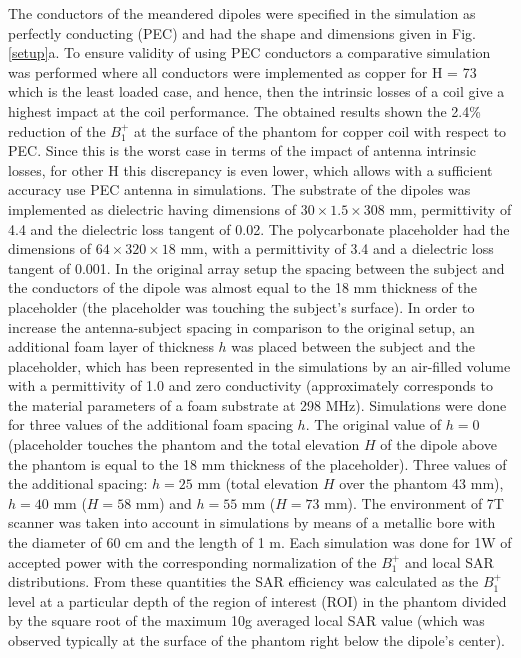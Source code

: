 \documentclass[fleqn,10pt]{wlscirep}
\begin{document}
The conductors of the meandered dipoles were specified in the simulation as perfectly conducting (PEC) and had the shape and dimensions given in Fig. \ref{setup}a. To ensure validity of using PEC conductors a comparative simulation was performed where all conductors were implemented as copper for H = 73 which is the least loaded case, and hence, then the intrinsic losses of a coil give a highest impact at the coil performance. The obtained results shown the 2.4\% reduction of the $B_1^{+}$ at the surface of the phantom for copper coil with respect to PEC. Since this is the worst case in terms of the impact of antenna intrinsic losses, for other H this discrepancy is even lower, which allows with a sufficient accuracy use PEC antenna in simulations. The substrate of the dipoles was implemented as dielectric having dimensions of $30\times1.5\times308$ mm,  permittivity of 4.4 and the dielectric loss tangent of 0.02. The polycarbonate placeholder had the dimensions of $64\times320\times18$ mm, with a permittivity of 3.4 and a dielectric loss tangent of 0.001. In the original array setup \cite{Fractionated} the spacing between the subject and the conductors of the dipole was almost equal to the 18 mm thickness of the placeholder (the placeholder was touching the subject's surface). In order to increase the antenna-subject spacing in comparison to the original setup, an additional foam layer of thickness $h$ was placed between the subject and the placeholder, which has been represented in the simulations by an air-filled volume with a permittivity of 1.0 and zero conductivity (approximately corresponds to the material parameters of a foam substrate at 298 MHz). Simulations were done for three values of the additional foam spacing $h$. The original value of $h=0$ (placeholder touches the phantom and the total elevation $H$ of the dipole above the phantom is equal to the 18 mm thickness of the placeholder). Three values of the additional spacing: $h=25$ mm (total elevation $H$ over the phantom 43 mm), $h=40$ mm ($H=58$ mm)  and $h=55$ mm ($H=73$ mm). The environment of 7T scanner was taken into account in simulations by means of a metallic bore with the diameter of 60 cm and the length of 1 m. Each simulation was done for 1W of accepted power with the corresponding normalization of the $B_1^{+}$ and local SAR distributions. From these quantities the SAR efficiency was calculated as the $B_1^{+}$ level at a particular depth of the region of interest (ROI) in the phantom divided by the square root of the maximum 10g averaged local SAR value (which was observed typically at the surface of the phantom right below the dipole's center). 
\end{document}

